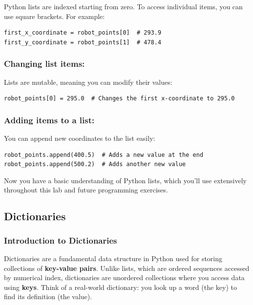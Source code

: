 Python lists are indexed starting from zero. To access individual items, you can use square brackets. For example:

\begin{verbatim}
first_x_coordinate = robot_points[0]  # 293.9
first_y_coordinate = robot_points[1]  # 478.4
\end{verbatim}

\subsubsection{Changing list items:}

Lists are mutable, meaning you can modify their values:

\begin{verbatim}
robot_points[0] = 295.0  # Changes the first x-coordinate to 295.0
\end{verbatim}

\subsubsection{Adding items to a list:}

You can append new coordinates to the list easily:

\begin{verbatim}
robot_points.append(400.5)  # Adds a new value at the end
robot_points.append(500.2)  # Adds another new value
\end{verbatim}

Now you have a basic understanding of Python lists, which you'll use extensively throughout this lab and future programming exercises.



\subsection{Dictionaries}
\label{sec:dictionaries}
\subsubsection{Introduction to Dictionaries}

Dictionaries are a fundamental data structure in Python used for storing collections of \textbf{key-value pairs}. Unlike lists, which are ordered sequences accessed by numerical index, dictionaries are unordered collections where you access data using \textbf{keys}. Think of a real-world dictionary: you look up a word (the key) to find its definition (the value).

